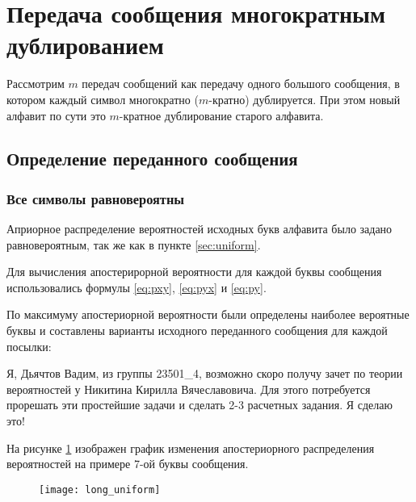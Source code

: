 \section{Передача сообщения многократным дублированием}

Рассмотрим $m$ передач сообщений как передачу одного большого сообщения, в котором каждый символ многократно ($m$-кратно) дублируется. При этом новый алфавит по сути это $m$-кратное дублирование старого алфавита.

\subsection{Определение переданного сообщения}

\subsubsection{Все символы равновероятны}

Априорное распределение вероятностей исходных букв алфавита было задано равновероятным, так же как в пункте \ref{sec:uniform}.

Для вычисления апостерирорной вероятности для каждой буквы сообщения использовались формулы \ref{eq:pxy}, \ref{eq:pyx} и \ref{eq:py}.

По максимуму апостериорной вероятности были определены наиболее вероятные буквы и составлены варианты исходного переданного сообщения для каждой посылки:

\vspace{0.5cm}
{ \scriptsize

Я, Дьячтов Вадим, из группы 23501\_4, возможно скоро получу зачет по теории вероятностей у Никитина Кирилла Вячеславовича. Для этого потребуется прорешать эти простейшие задачи и сделать 2-3 расчетных задания. Я сделаю это!

}
\vspace{0.5cm}

На рисунке \ref{plt:long_uniform} изображен график изменения апостериорного распределения вероятностей на примере 7-ой буквы сообщения.

\begin{figure}[H]
\begin{center}
	\vspace{-0.9cm}
	\texttt{[image: long\_uniform]}
	\caption{}
	\label{plt:long_uniform}
	\vspace{-0.5cm}
\end{center}
\end{figure}


